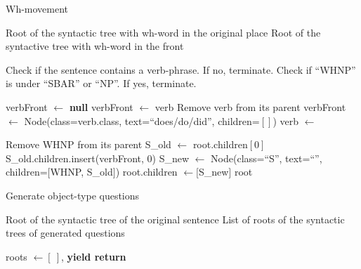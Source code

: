 \begin{algorithm}
\caption{Wh-movement}
\label{alg:whmove}
\begin{algorithmic}[1]
\Require Root of the syntactic tree with wh-word in the original place
\Ensure Root of the syntactive tree with wh-word in the front

\State Check if the sentence contains a verb-phrase. If no, terminate.
\State Check if ``WHNP'' is under ``SBAR'' or ``NP''. If yes, terminate.

\State verbFront $\gets$ \textbf{null}
    \State verbFront $\gets$ verb
    \State Remove verb from its parent
\Else
    \State verbFront $\gets$ Node(class=verb.class, text=``does/do/did'', children=$[]$)
    \State verb $\gets$ 
\EndIf

\State Remove WHNP from its parent
\State S\_old $\gets$ root.children$[0]$
\State S\_old.children.insert(verbFront, 0) 
\State S\_new $\gets$ Node(class=``S'', text=``'', children=$[$WHNP, S\_old$]$)
\State root.children $\gets [$S\_new$]$
\State \Return root
\EndProcedure
\end{algorithmic}
\end{algorithm}

\begin{algorithm}
\caption{Generate object-type questions}
\label{alg:askWhat}
\begin{algorithmic}[1]
\Require Root of the syntactic tree of the original sentence
\Ensure List of roots of the syntactic trees of generated questions

\State {}
    \State roots $\gets [\ ]$, 
        \State \textbf{yield return} 
    \EndFor
\EndFor
\EndProcedure
\end{algorithmic}
\end{algorithm}


